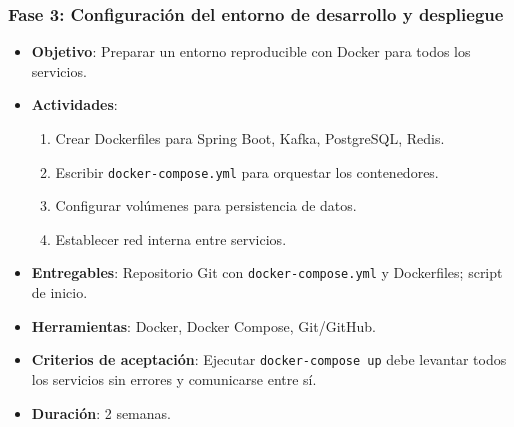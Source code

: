 \subsubsection{Fase 3: Configuración del entorno de desarrollo y despliegue}
\begin{itemize}
    \item \textbf{Objetivo}: Preparar un entorno reproducible con Docker para todos los servicios.
    \item \textbf{Actividades}:
        \begin{enumerate}
            \item Crear Dockerfiles para Spring Boot, Kafka, PostgreSQL, Redis.
            \item Escribir \texttt{docker-compose.yml} para orquestar los contenedores.
            \item Configurar volúmenes para persistencia de datos.
            \item Establecer red interna entre servicios.
        \end{enumerate}
    \item \textbf{Entregables}: Repositorio Git con \texttt{docker-compose.yml} y Dockerfiles; script de inicio.
    \item \textbf{Herramientas}: Docker, Docker Compose, Git/GitHub.
    \item \textbf{Criterios de aceptación}: Ejecutar \texttt{docker-compose up} debe levantar todos los servicios sin errores y comunicarse entre sí.
    \item \textbf{Duración}: 2 semanas.
\end{itemize}

